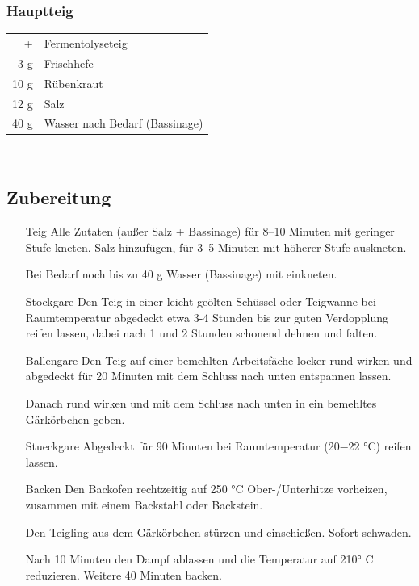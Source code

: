 \subsubsection*{Hauptteig}
\begin{tabular}{r l}
    + & Fermentolyseteig                                      \\
    3 g & Frischhefe          \\
    10 g & Rübenkraut \\
    12 g & Salz                                                  \\
    40 g & Wasser nach Bedarf (\Gls{Bassinage})                        \\
\end{tabular}\\


\subsection*{Zubereitung}
\begin{enumerate}
    \item [Teig] 
        Alle Zutaten (außer Salz + Bassinage) für 8–10 Minuten mit geringer Stufe kneten. Salz hinzufügen, für 3–5 Minuten mit höherer Stufe auskneten. 
        
        Bei Bedarf noch bis zu 40 g Wasser (Bassinage) mit einkneten.
        \item [\Gls{Stockgare}]
        Den Teig in einer leicht geölten Schüssel oder Teigwanne bei Raumtemperatur abgedeckt etwa 3-4 Stunden bis zur guten Verdopplung reifen lassen, dabei nach 1 und 2 Stunden schonend dehnen und falten.
        \item [\Gls{Ballengare}]
        Den Teig auf einer bemehlten Arbeitsfäche locker rund wirken und abgedeckt für 20 Minuten mit dem Schluss nach unten entspannen lassen. 
        
        Danach rund wirken und mit dem Schluss nach unten in ein bemehltes Gärkörbchen geben.
        \item [\Gls{Stueckgare}]
        Abgedeckt für 90 Minuten bei Raumtemperatur (20−22 °C) reifen lassen.
        \item [Backen]
        Den Backofen rechtzeitig auf 250 °C Ober-/Unterhitze  vorheizen, zusammen mit einem Backstahl oder Backstein.
        
        Den Teigling aus dem Gärkörbchen stürzen und einschießen. Sofort schwaden. 
        
        Nach 10 Minuten den Dampf ablassen und die Temperatur auf 210° C reduzieren. Weitere 40 Minuten backen.
    \end{enumerate}


